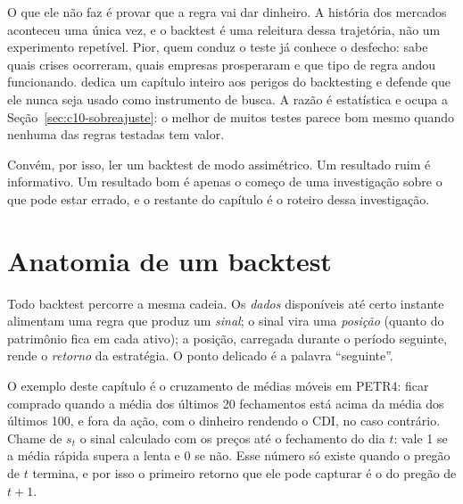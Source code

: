O que ele não faz é provar que a regra vai dar dinheiro. A história dos mercados aconteceu uma única vez, e o backtest é uma releitura dessa trajetória, não um experimento repetível. Pior, quem conduz o teste já conhece o desfecho: sabe quais crises ocorreram, quais empresas prosperaram e que tipo de regra andou funcionando. \citet{lopezdeprado2018} dedica um capítulo inteiro aos perigos do backtesting e defende que ele nunca seja usado como instrumento de busca. A razão é estatística e ocupa a Seção~\ref{sec:c10-sobreajuste}: o melhor de muitos testes parece bom mesmo quando nenhuma das regras testadas tem valor.

Convém, por isso, ler um backtest de modo assimétrico. Um resultado ruim é informativo. Um resultado bom é apenas o começo de uma investigação sobre o que pode estar errado, e o restante do capítulo é o roteiro dessa investigação.

\section{Anatomia de um backtest}
\label{sec:c10-anatomia}

Todo backtest percorre a mesma cadeia. Os \emph{dados} disponíveis até certo instante alimentam uma regra que produz um \emph{sinal}; o sinal vira uma \emph{posição} (quanto do patrimônio fica em cada ativo); a posição, carregada durante o período seguinte, rende o \emph{retorno} da estratégia. O ponto delicado é a palavra ``seguinte''.

O exemplo deste capítulo é o cruzamento de médias móveis em PETR4: ficar comprado quando a média dos últimos 20 fechamentos está acima da média dos últimos 100, e fora da ação, com o dinheiro rendendo o CDI, no caso contrário. Chame de $s_t$ o sinal calculado com os preços até o fechamento do dia $t$: vale 1 se a média rápida supera a lenta e 0 se não. Esse número só existe quando o pregão de $t$ termina, e por isso o primeiro retorno que ele pode capturar é o do pregão de $t+1$.

